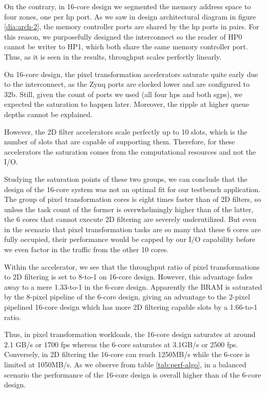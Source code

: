 On the contrary, in 16-core design we segmented the memory address space to four zones, one per \gls{hp} port.
As we saw in design architectural diagram in figure \ref{dia:arch-2}, the memory controller ports are shared 
by the \gls{hp} ports in pairs. 
For this reason, we purposefully designed the interconnect so the reader of HP0 cannot be writer to HP1,
which both share the same memory controller port.
Thus, as it is seen in the results, throughput scales perfectly linearly.

On 16-core design, the pixel transformation accelerators saturate quite early due to the interconnect,
as the Zynq ports are clocked lower and are configured to 32b. 
Still, given the count of ports we used (all four \glspl{hp} and both \glspl{sgp}), we expected the saturation to happen later.
Moreover, the ripple at higher queue depths cannot be explained.

However, the 2D filter accelerators scale perfectly up to 10 slots, which is the number of slots that are capable of supporting them.
Therefore, for these accelerators the saturation comes from the computational resources and not the I/O.

Studying the saturation points of these two groups, we can conclude that the design of the 16-core system was not
an optimal fit for our testbench application. The group of pixel transformation cores is eight times faster than of 2D filters,
so unless the task count of the former is overwhelmingly higher than of the latter, the 6 cores that cannot execute 2D filtering
are severely underutilized. But even in the scenario that pixel transformation tasks are so many that these 6 cores
are fully occupied, their performance would be capped by our I/O capability before we even factor in the traffic from the other 10 cores.

Within the accelerator, we see that the throughput ratio of pixel transformations to 2D filtering is set to 8-to-1 on 16-core design.
However, this advantage fades away to a mere 1.33-to-1 in the 6-core design. Apparently the BRAM is saturated by the
8-pixel pipeline of the 6-core design, giving an advantage to the 2-pixel pipelined 16-core design which has more 2D filtering
capable slots by a 1.66-to-1 ratio.

Thus, in pixel transformation workloads, the 16-core design saturates at around 2.1 GB/s or 1700 fps whereas the 6-core
saturates at 3.1GB/s or 2500 fps. Conversely, in 2D filtering the 16-core can reach 1250MB/s while the 6-core is limited at 1050MB/s.
As we observe from table \ref{tab:perf-algo}, in a balanced scenario the performance of the 16-core design is overall higher than of the 6-core design.


